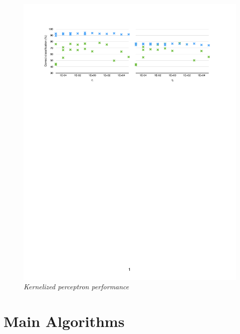 \documentclass          {article} %
\begin{document}
\begin                  {figure}
\begin                  {center}
\includegraphics        [scale = 0.6]
                        {fig1.pdf}
\caption                {\small\textit{Kernelized perceptron performance}}%
\label                  {fig:fig1}
\end                    {center}
\end                    {figure}


\section                {Main Algorithms}
\label                  {sec:main_algorithms}
\end{document}
